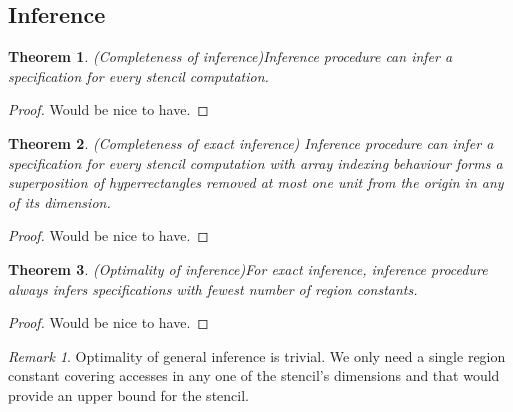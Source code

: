 \documentclass{article}
\theoremstyle{definition}
\theoremstyle{plain}
\newtheorem{thm}{Theorem}
\theoremstyle{remark}
\newtheorem{remark}{Remark}
\begin{document}
\subsection{Inference}

\begin{thm}{(Completeness of inference)}\label{thm:inf-completeness}
  Inference procedure can infer a specification for every stencil computation.
\end{thm}
%
\begin{proof}
  Would be nice to have.
\end{proof}

\begin{thm}{(Completeness of exact inference)}
  Inference procedure can infer a specification for every stencil computation
  with array indexing behaviour forms a superposition of hyperrectangles removed
  at most one unit from the origin in any of its dimension.
\end{thm}
%
\begin{proof}
  Would be nice to have.
\end{proof}

\begin{thm}{(Optimality of inference)}\label{thm:inf-optimality}
  For exact inference, inference procedure always infers specifications with
  fewest number of region constants.
\end{thm}
%
\begin{proof}
  Would be nice to have.
\end{proof}

\begin{remark}{}
  Optimality of general inference is trivial. We only need a single region
  constant covering accesses in any one of the stencil's dimensions and that
  would provide an upper bound for the stencil.
\end{remark}
\end{document}

